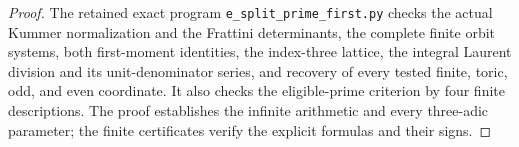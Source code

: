 \begin{proof}
The retained exact
program
\texttt{e\_split\_prime\_first.py}
checks the actual
Kummer normalization
and the Frattini
determinants, the
complete finite orbit
systems, both
first-moment identities,
the index-three lattice,
the integral Laurent
division and its
unit-denominator
series, and recovery
of every tested
finite, toric, odd,
and even coordinate.
It also checks the
eligible-prime
criterion by four
finite descriptions.
The proof establishes
the infinite arithmetic
and every three-adic
parameter; the finite
certificates verify
the explicit formulas
and their signs.
\end{proof}
